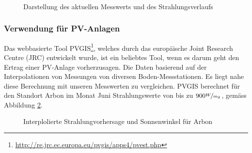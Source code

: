 
\begin{figure}[htbp]
	\centering
	\caption{Darstellung des aktuellen Messwerts und des Strahlungsverlaufs}
	\label{img:radiation}
\end{figure}


\subsubsection{Verwendung für PV-Anlagen}
Das webbasierte Tool PVGIS\footnote{\url{http://re.jrc.ec.europa.eu/pvgis/apps4/pvest.php}}, welches durch das europäische Joint Research Centre (JRC) entwickelt wurde, ist ein beliebtes Tool, wenn es darum geht den Ertrag einer PV-Anlage vorherzusagen. Die Daten basierend auf der Interpolationen von Messungen von diversen Boden-Messstationen. Es liegt nahe diese Berechnung mit unseren Messwerten zu vergleichen. PVGIS berechnet für den Standort Arbon im Monat Juni Strahlungswerte von bis zu $900 \nicefrac{W}{m_2}$, gemäss Abbildung \ref{img:pvgis}.

\begin{figure}[htbp]
	\centering
	\caption{Interplolierte Strahlungvorhersage und Sonnenwinkel für Arbon}
	\label{img:pvgis}
\end{figure}





